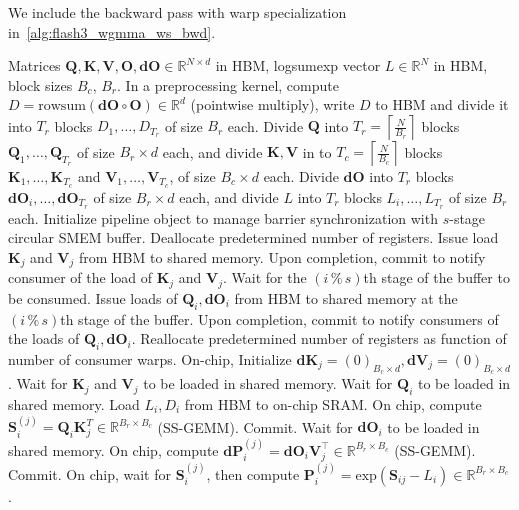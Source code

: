 \documentclass{article}
\renewcommand{\exp}{\mathrm{exp}}
\newcommand{\vQ}{\mathbf{Q}}
\newcommand{\vK}{\mathbf{K}}
\newcommand{\vV}{\mathbf{V}}
\newcommand{\vdK}{\mathbf{dK}}
\newcommand{\vdV}{\mathbf{dV}}
\newcommand{\vS}{\mathbf{S}}
\newcommand{\vP}{\mathbf{P}}
\newcommand{\vdP}{\mathbf{dP}}
\newcommand{\vO}{\mathbf{O}}
\newcommand{\vdO}{\mathbf{dO}}
\newcommand{\fat}{\textsc{FlashAttention-3}\xspace}  %
\begin{document}
We include the backward pass with warp specialization in~\cref{alg:flash3_wgmma_ws_bwd}.
\begin{algorithm}[H]
    \caption{\small\label{alg:flash3_wgmma_ws_bwd}\fat backward pass with warp specialization}
    \begin{algorithmic}[1]
\REQUIRE Matrices $\vQ, \vK, \vV, \vO, \vdO \in \mathbb{R}^{N \times d}$ in HBM,
logsumexp vector $L \in \mathbb{R}^N$ in HBM, block sizes $B_c$, $B_r$.
\STATE In a preprocessing kernel, compute $D = \mathrm{rowsum}(\vdO \circ \vO) \in \mathbb{R}^d$ (pointwise multiply), write
$D$ to HBM and divide it into $T_r$ blocks $D_1, \dots, D_{T_r}$ of size
$B_r$ each.
\STATE Divide $\vQ$ into $T_r = \left\lceil\frac{N}{B_r} \right\rceil$ blocks $\vQ_1, \dots, \vQ_{T_r}$ of size $B_r \times d$ each,
and divide $\vK, \vV$ in to $T_c = \left\lceil \frac{N}{B_c} \right\rceil$ blocks $\vK_1, \dots, \vK_{T_c}$ and
$\vV_1, \dots, \vV_{T_c}$, of size $B_c \times d$ each.
\STATE Divide $\vdO$ into $T_r$ blocks $\vdO_i, \dots, \vdO_{T_r}$
of size $B_r \times d$ each, and divide $L$ into $T_r$ blocks $L_i, \dots, L_{T_r}$ of size
$B_r$ each.
\STATE Initialize pipeline object to manage barrier synchronization with $s$-stage circular SMEM buffer.
\STATE Deallocate predetermined number of registers.
\STATE Issue load $\vK_j$ and $\vV_j$ from HBM to shared memory.
\STATE Upon completion, commit to notify consumer of the load of $\vK_j$ and $\vV_j$.
    \STATE Wait for the $(i\,\%\,s)$th stage of the buffer to be consumed.
    \STATE Issue loads of $\vQ_i, \vdO_i$ from HBM to shared memory at the $(i\,\%\,s)$th stage of the buffer.
    \STATE Upon completion, commit to notify consumers of the loads of $\vQ_i, \vdO_i$.
\ENDFOR
{}
\STATE Reallocate predetermined number of registers as function of number of consumer warps.
\STATE On-chip, Initialize $\vdK_j = (0)_{B_c \times d}, \vdV_j = (0)_{B_c \times d}$ .
\STATE Wait for $\vK_j$ and $\vV_j$ to be loaded in shared memory.
\STATE Wait for $\vQ_i$ to be loaded in shared memory.
\STATE Load $L_i, D_i$ from HBM to on-chip SRAM.
\STATE On chip, compute $\vS_{i}^{(j)} = \vQ_i \vK_j^T \in \mathbb{R}^{B_r \times B_c}$
(SS-GEMM). Commit.
\STATE Wait for $\vdO_i$ to be loaded in shared memory.
\STATE On chip, compute $\vdP_{i}^{(j)} = \vdO_{i} \vV_j^\top \in \mathbb{R}^{B_r \times B_c}$
(SS-GEMM). Commit.
\STATE On chip, wait for $\vS_{i}^{(j)}$, then compute $\vP_{i}^{(j)} = \exp(\vS_{ij} - L_{i}) \in \mathbb{R}^{B_r \times B_c}$.

\end{algorithmic}
\end{algorithm}
\end{document}
